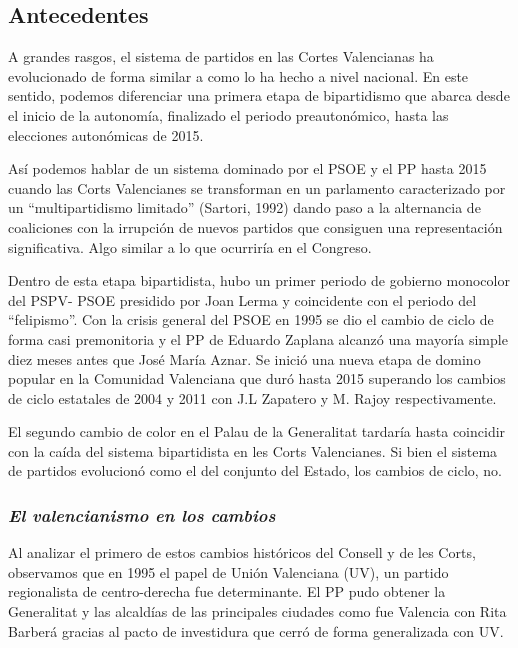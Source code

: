 \documentclass[
]{article}
\begin{document}
\hypertarget{antecedentes}{%
\subsection{Antecedentes}\label{antecedentes}}

A grandes rasgos, el sistema de partidos en las Cortes Valencianas ha
evolucionado de forma similar a como lo ha hecho a nivel nacional. En
este sentido, podemos diferenciar una primera etapa de bipartidismo que
abarca desde el inicio de la autonomía, finalizado el periodo
preautonómico, hasta las elecciones autonómicas de 2015.

Así podemos hablar de un sistema dominado por el PSOE y el PP hasta 2015
cuando las Corts Valencianes se transforman en un parlamento
caracterizado por un ``multipartidismo limitado'' (Sartori, 1992) dando
paso a la alternancia de coaliciones con la irrupción de nuevos partidos
que consiguen una representación significativa. Algo similar a lo que
ocurriría en el Congreso.

Dentro de esta etapa bipartidista, hubo un primer periodo de gobierno
monocolor del PSPV- PSOE presidido por Joan Lerma y coincidente con el
periodo del ``felipismo''. Con la crisis general del PSOE en 1995 se dio
el cambio de ciclo de forma casi premonitoria y el PP de Eduardo Zaplana
alcanzó una mayoría simple diez meses antes que José María Aznar. Se
inició una nueva etapa de domino popular en la Comunidad Valenciana que
duró hasta 2015 superando los cambios de ciclo estatales de 2004 y 2011
con J.L Zapatero y M. Rajoy respectivamente.

El segundo cambio de color en el Palau de la Generalitat tardaría hasta
coincidir con la caída del sistema bipartidista en les Corts
Valencianes. Si bien el sistema de partidos evolucionó como el del
conjunto del Estado, los cambios de ciclo, no.

\hypertarget{el-valencianismo-en-los-cambios}{%
\subsubsection{\texorpdfstring{\emph{El valencianismo en los
cambios}}{El valencianismo en los cambios}}\label{el-valencianismo-en-los-cambios}}

Al analizar el primero de estos cambios históricos del Consell y de les
Corts, observamos que en 1995 el papel de Unión Valenciana (UV), un
partido regionalista de centro-derecha fue determinante. El PP pudo
obtener la Generalitat y las alcaldías de las principales ciudades como
fue Valencia con Rita Barberá gracias al pacto de investidura que cerró
de forma generalizada con UV.
\end{document}

